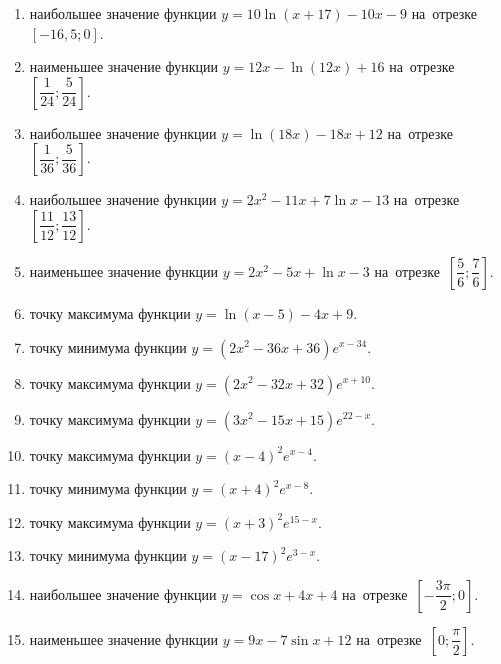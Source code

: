 \documentclass[a4paper,10pt]{article}
\begin{document}
\begin{enumerate}
\item {} наибольшее значение функции $y = 10\ln \left(x+17\right)-10x -9$ на~отрезке~$\left[-16,5;0\right]$.

\item {} наименьшее значение функции $y = 12x-\ln \left(12x\right)+16$ на~отрезке~$\left[\dfrac{1}{24};\dfrac{5}{24}\right]$.

\item {} наибольшее значение функции $y = \ln \left(18x\right)-18x+12$ на~отрезке~$\left[\dfrac{1}{36};\dfrac{5}{36}\right]$.

\item {} наибольшее значение функции $y=2x^2-11x+7\ln x-13$ на~отрезке~$\left[\dfrac{11}{12};\dfrac{13}{12}\right]$.

\item {} наименьшее значение функции $y=2x^2-5x+\ln x-3$ на~отрезке~$\left[\dfrac{5}{6};\dfrac{7}{6}\right]$.

\item {} точку максимума функции $y=\ln \left(x-5\right)-4x+9$.

\item {} точку минимума функции $y=\left(2x^2-36x+36\right)e^{x-34}$.

\item {} точку максимума функции $y=\left(2x^2-32x+32\right)e^{x+10}$.

\item {} точку максимума функции $y=\left(3x^2-15x+15\right)e^{22-x}$.

\item {} точку максимума функции $y=\left(x -4\right)^2e^{x-4}$.

\item {} точку минимума функции $y=\left(x +4\right)^2e^{x-8}$.

\item {} точку максимума функции $y=\left(x +3\right)^2e^{15-x}$.

\item {} точку минимума функции $y=\left(x -17\right)^2e^{3-x}$.

\item {} наибольшее значение функции $y=\cos x+4x +4$ на~отрезке~$\left[-\dfrac{3\pi }{2};0\right]$.

\item {} наименьшее значение функции $y=9x-7\sin x +12$ на~отрезке~$\left[0;\dfrac{\pi }{2}\right]$.


\end{enumerate}
\end{document}
